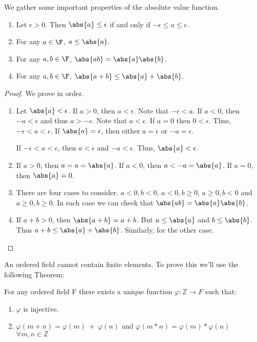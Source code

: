 \begin{Proposition}
    We gather some important properties of the absolute value function.
    \begin{enumerate}
	\item
	    Let $\epsilon > 0$. Then $\abs{a} \leq \epsilon$ if and only if $-\epsilon \leq a \leq \epsilon$.
	\item
	    For any $a\in \F$, $a \leq \abs{a}$.
	\item
	    For any $a,b \in \F$, $\abs{ab} = \abs{a}\abs{b}$.
	\item
	    For any $a,b \in \F$, $\abs{a + b} \leq \abs{a} + \abs{b}$.
    \end{enumerate}
\end{Proposition}
\begin{proof}
    We prove in order.
    \begin{enumerate}
	\item
	    Let $\abs{a} < \epsilon$. If $a > 0$, then $a < \epsilon$. Note that $-\epsilon < a$. If $a < 0$,
	    then $-a < \epsilon$ and thus $a > -\epsilon$. Note that $a < \epsilon$. If $a = 0$ then $0 <
	    \epsilon$. Thus, $-\epsilon < a < \epsilon$. If $\abs{a} = \epsilon$, then either $a = \epsilon$
	    or $-a = \epsilon$. 

	    If $-\epsilon < a < \epsilon$, then $a < \epsilon$ and $ -a < \epsilon$. Thus, $ \abs{a} <
	    \epsilon$.
	\item
	    If $a > 0$, then $ a = a = \abs{a}$. If $a < 0$, then $a < -a = \abs{a}$. If $a = 0$, then
	    $\abs{a} = 0$.
	\item
	    There are four cases to consider. $a < 0, b < 0$, $a < 0 , b \geq 0$, $a \geq 0,b < 0$ and 
	    $a \geq 0, b\geq 0$. In each case we can check that $\abs{ab} = \abs{a}\abs{b}$.
	\item
	    If $a + b > 0$, then $\abs{a + b} = a + b$. But $a \leq \abs{a}$ and $b\leq \abs{b}$. Thus $a + b
	    \leq \abs{a} + \abs{b}$. Similarly, for the other case.
    \end{enumerate}
\end{proof}
An ordered field cannot contain finite elements.
To prove this we'll use the following Theorem:
\begin{Theorem}[name=Ordered fields contain Integers]\label{th:orf_1to1}
    For any ordered field F there exists a unique function $\varphi : \mathbb{Z} \rightarrow F$
    such that: 
\begin{enumerate}
	\item $\varphi$ is injective.
	\item $\varphi(m+n) = \varphi(m) \ + \ \varphi(n)$ and
	    $\varphi(m*n) = \varphi(m) * \varphi(n)$ $\forall m,n \in \mathbb{Z}$ 
\end{enumerate}
\end{Theorem}
